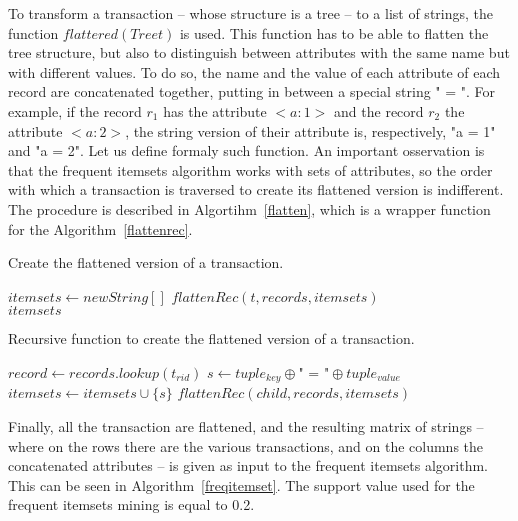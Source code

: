 \documentclass{acm_proc_article-sp-sigmod09}
\begin{document}
To transform a transaction -- whose structure is a tree -- to a list of strings, the function $flattered(Tree t)$ is used. This function has to be able to flatten the tree structure, but also to distinguish between attributes with the same name but with different values. To do so, the name and the value of each attribute of each record are concatenated together, putting in between a special string " = ". For example, if the record $r_1$ has the attribute $<a \colon 1>$ and the record $r_2$ the attribute $<a \colon 2>$, the string version of their attribute is, respectively, "a = 1" and "a = 2". Let us define formaly such function. An important osservation is that the frequent itemsets algorithm works with sets of attributes, so the order with which a transaction is traversed to create its flattened version is indifferent. The procedure is described in Algortihm~\ref{flatten}, which is a wrapper function for the Algorithm~\ref{flattenrec}.

\begin{algorithm}
\caption{Create the flattened version of a transaction.}
\label{flatten}
\begin{algorithmic}[1]
\State $itemsets \gets new String[]$
\State $flattenRec(t, records, itemsets)$ \\
\Return $itemsets$
\EndFunction
\end{algorithmic}
\end{algorithm}

\begin{algorithm}
\caption{Recursive function to create the flattened version of a transaction.}
\label{flattenrec}
\begin{algorithmic}[1]
\State $record \gets records.lookup(t_{rid})$
	\State $s \gets tuple_{key} \oplus \text{" = "} \oplus tuple_{value}$
	\State $itemsets \gets itemsets \cup \{s\}$
\EndFor
{}
	\State $flattenRec(child, records, itemsets)$
\EndFor
\EndFunction
\end{algorithmic}
\end{algorithm}

Finally, all the transaction are flattened, and the resulting matrix of strings -- where on the rows there are the various transactions, and on the columns the concatenated attributes -- is given as input to the frequent itemsets algorithm. This can be seen in Algorithm~\ref{freqitemset}. The support value used for the frequent itemsets mining is equal to 0.2.
\end{document}
